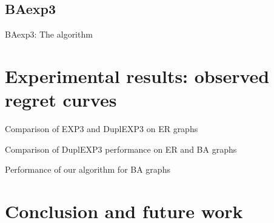 \documentclass[11pt,xcolor={dvipsnames}]{beamer}
\begin{document}
\subsection{BAexp3}
\begin{frame}{BAexp3: The algorithm}
\end{frame}


\section{Experimental results: observed regret curves}
\begin{frame}{Comparison of EXP3 and DuplEXP3 on ER graphs}
\end{frame}

\begin{frame}{Comparison of DuplEXP3 performance on ER and BA graphs}
\end{frame}

\begin{frame}{Performance of our algorithm for BA graphs}
\end{frame}

\section{Conclusion and future work}
\end{document}
